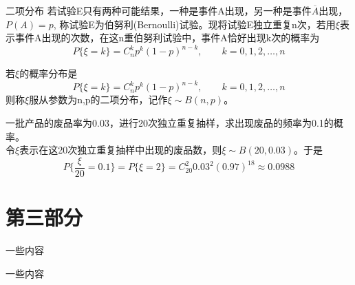 \documentclass[xcolor=svgnames,serif,table,10pt]{beamer}
\begin{document}
\begin{frame}
\begin{block}{二项分布}
	若试验E只有两种可能结果，一种是事件A出现，另一种是事件$\overline{A}$出现，$P(A)=p$, 称试验E为伯努利(Bernoulli)试验。现将试验E独立重复n次，若用$\xi$表示事件A出现的次数，在这n重伯努利试验中，事件A恰好出现k次的概率为
	\[P\{\xi=k\}=C_{n}^{k}p^{k}(1-p)^{n-k},\qquad k=0,1,2,\dots,n\]
\end{block}
\begin{definition}[二项分布]
	若$\xi$的概率分布是
	\[P\{\xi=k\}=C_{n}^{k}p^{k}(1-p)^{n-k},\qquad k=0,1,2,\dots,n\]
	则称$\xi$服从参数为n,p的二项分布，记作$\xi\sim B(n,p)$。
\end{definition}
\end{frame}

\begin{frame}
\begin{example}
	一批产品的废品率为0.03，进行20次独立重复抽样，求出现废品的频率为0.1的概率。\\
	令$\xi$表示在这20次独立重复抽样中出现的废品数，则$\xi\sim B(20,0.03)$。于是
	\[P\{\frac{\xi}{20}=0.1\}=P\{\xi=2\}=C_{20}^{2}0.03^{2}(0.97)^{18}\approx 0.0988\]
\end{example}
\end{frame}
\section{第三部分}
\begin{frame}
  一些内容
\end{frame}
\begin{frame}
  一些内容
\end{frame}




\begin{frame}[plain]{}
  \begin{center}
  \end{center}
\end{frame}
\end{document}
